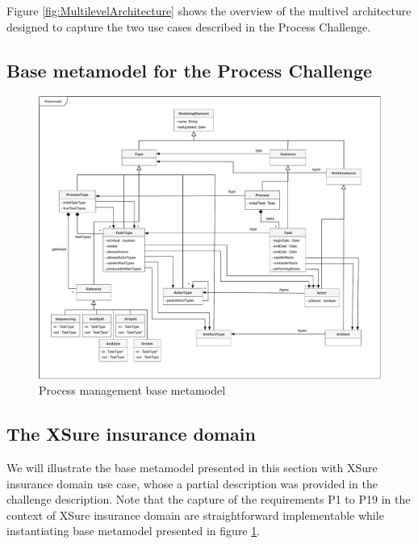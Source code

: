 
Figure \ref{fig:MultilevelArchitecture} shows the overview of the multivel architecture designed to capture the two use cases described in the Process Challenge.


\subsection{Base metamodel for the Process Challenge}

\begin{figure}
 \centering
    \includegraphics[width=1.0 \textwidth]{Figures/Metamodel.pdf}
    \caption{Process management base metamodel}
    \label{fig:BaseMetamodel}
\end{figure}

\subsection{The XSure insurance domain}

We will illustrate the base metamodel presented in this section with XSure insurance domain use case, whose a partial description was provided in the challenge description. Note that the capture of the requirements P1 to P19 in the context of XSure insurance domain are straightforward implementable while instantiating base metamodel presented in figure \ref{fig:BaseMetamodel}.

